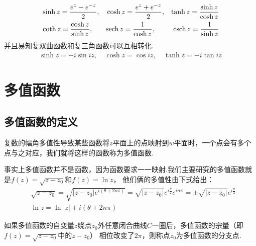 \documentclass[lang=cn, titlestyle=display, scheme=chinese]{elegantbook}
\begin{document}
\begin{enumerate}
                        \begin{align*}
                            & \sinh{z} = \frac{e^z - e^{-z}}{2},& &\cosh{z} = \frac{e^z + e^{-z}}{2}, & \tanh{z} = \frac{\sinh{z}}{\cosh{z}}&\\
                            & \coth{z} = \frac{\cosh{z}}{\sinh{z}},& &\textnormal{sech}\,z = \frac{1}{\cosh{z}}, & \textnormal{csch}\,z = \frac{1}{\sinh{z}}&
                        \end{align*}
                        并且易知复双曲函数和复三角函数可以互相转化.
                        \begin{align*}
                            \sinh{z} = -i\sin{iz}, \quad \cosh{z} = \cos{iz}, \quad \tanh{z} = -i\tan{iz}
                        \end{align*}
                \end{enumerate}


        \section{多值函数}

            \subsection{多值函数的定义}
                \allowdisplaybreaks
                \begin{definition}[多值函数]\label{def:multi_value_function}
                    复数的幅角多值性导致某些函数将$z$平面上的点映射到$w$平面时，一个点会有多个点与之对应，我们就将这样的函数称为多值函数.
                \end{definition}

                事实上多值函数并不是函数，因为函数要求一一映射.我们主要研究的多值函数就是$f(z) = \sqrt{z - z_0}$和$f(z) = \ln{z}$，
                他们俩的多值性由下式给出：
                \begin{align}
                    \label{eq:multi_value_function}
                    &\sqrt{z - z_0} = \sqrt{|z - z_0|e^{i(\theta + 2n\pi)}} = \sqrt{|z - z_0|}e^{i\frac{\theta}{2}}e^{in\pi} = \pm \sqrt{|z - z_0|}e^{i\frac{\theta}{2}}\\
                    &\ln{z} = \ln{|z|} + i(\theta + 2n\pi)
                \end{align}

                \begin{definition}[分支点（枝点）]\label{def:branch_point}
                    如果多值函数的自变量$z$绕点$z_0$外任意闭合曲线$C$一圈后，多值函数的宗量（即$f(z) = \sqrt{z - z_0}$中的$z - z_0$）
                    相位改变了$2\pi$，则称点$z_0$为多值函数的分支点.
                \end{definition}
\end{document}
